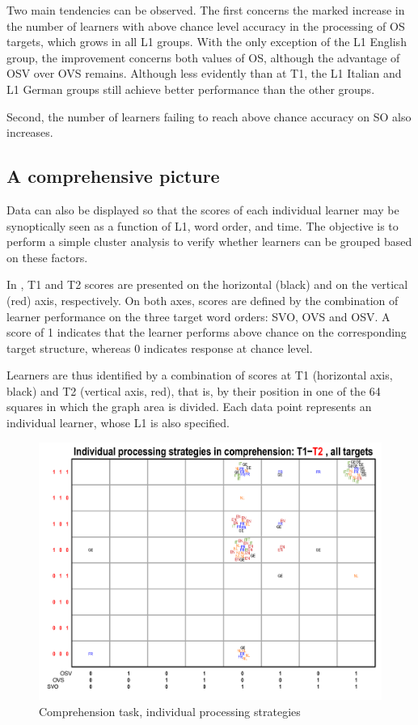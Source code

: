 Two main tendencies can be observed. The first concerns the marked increase in the number of learners with above chance level accuracy in the processing of OS targets, which grows in all L1 groups. With the only exception of the L1 English group, the improvement concerns both values of OS, although the advantage of OSV over OVS remains. Although less evidently than at T1, the L1 Italian and L1 German groups still achieve better performance than the other groups.

Second, the number of learners failing to reach above chance accuracy on SO also increases.

\subsection{A comprehensive picture}\label{sec:05:2.4}

Data can also be displayed so that the scores of each individual learner may be synoptically seen as a function of L1, word order, and time. The objective is to perform a simple cluster analysis to verify whether learners can be grouped based on these factors. 

In , T1 and T2 scores are presented on the horizontal (black) and on the vertical (red) axis, respectively. On both axes, scores are defined by the combination of learner performance on the three target word orders: SVO, OVS and OSV. A score of 1 indicates that the learner performs above chance on the corresponding target structure, whereas 0 indicates response at chance level. 

Learners are thus identified by a combination of scores at T1 (horizontal axis, black) and T2 (vertical axis, red), that is, by their position in one of the 64 squares in which the graph area is divided. Each data point represents an individual learner, whose L1 is also specified.

\begin{figure}
    \includegraphics[width=\textwidth]{figures/05-7.pdf}
    \caption{Comprehension task, individual processing strategies}
    \label{fig:05:7}
\end{figure}

